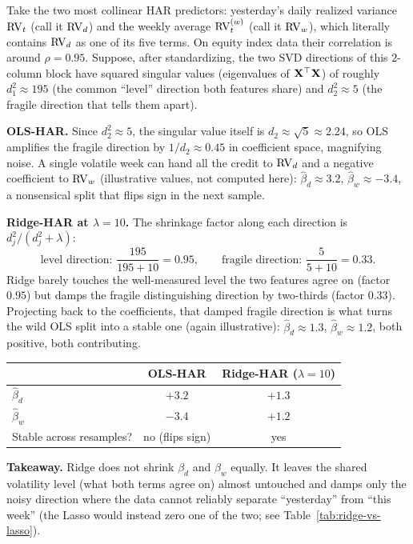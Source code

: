 \begin{workedexample}
Take the two most collinear HAR predictors: yesterday's daily realized variance $\operatorname{RV}_t$ (call it $\operatorname{RV}_d$) and the weekly average $\operatorname{RV}^{(w)}_t$ (call it $\operatorname{RV}_w$), which literally contains $\operatorname{RV}_d$ as one of its five terms.
On equity index data their correlation is around $\rho = 0.95$.
Suppose, after standardizing, the two SVD directions of this $2$-column block have squared singular values (eigenvalues of $\mathbf{X}^\top\mathbf{X}$) of roughly $d_1^2 \approx 195$ (the common ``level'' direction both features share) and $d_2^2 \approx 5$ (the fragile direction that tells them apart).

\textbf{OLS-HAR.}
Since $d_2^2 \approx 5$, the singular value itself is $d_2 \approx \sqrt{5} \approx 2.24$, so OLS amplifies the fragile direction by $1/d_2 \approx 0.45$ in coefficient space, magnifying noise.
A single volatile week can hand all the credit to $\operatorname{RV}_d$ and a negative coefficient to $\operatorname{RV}_w$ (illustrative values, not computed here): $\hat\beta_d \approx 3.2$, $\hat\beta_w \approx -3.4$, a nonsensical split that flips sign in the next sample.

\textbf{Ridge-HAR at $\lambda = 10$.}
The shrinkage factor along each direction is $d_j^2/(d_j^2+\lambda)$:
\[
  \text{level direction: } \frac{195}{195+10} = 0.95, \qquad
  \text{fragile direction: } \frac{5}{5+10} = 0.33.
\]
Ridge barely touches the well-measured level the two features agree on (factor $0.95$) but damps the fragile distinguishing direction by two-thirds (factor $0.33$).
Projecting back to the coefficients, that damped fragile direction is what turns the wild OLS split into a stable one (again illustrative): $\hat\beta_d \approx 1.3$, $\hat\beta_w \approx 1.2$, both positive, both contributing.

\medskip
\begin{center}
\begin{tabular}{@{} l c c @{}}
\toprule
 & \textbf{OLS-HAR} & \textbf{Ridge-HAR ($\lambda=10$)} \\
\midrule
$\hat\beta_d$ & $+3.2$ & $+1.3$ \\
$\hat\beta_w$ & $-3.4$ & $+1.2$ \\
Stable across resamples? & no (flips sign) & yes \\
\bottomrule
\end{tabular}
\end{center}
\medskip

\textbf{Takeaway.}
Ridge does not shrink $\beta_d$ and $\beta_w$ equally.
It leaves the shared volatility level (what both terms agree on) almost untouched and damps only the noisy direction where the data cannot reliably separate ``yesterday'' from ``this week'' (the Lasso would instead zero one of the two; see Table~\ref{tab:ridge-vs-lasso}).
\end{workedexample}

